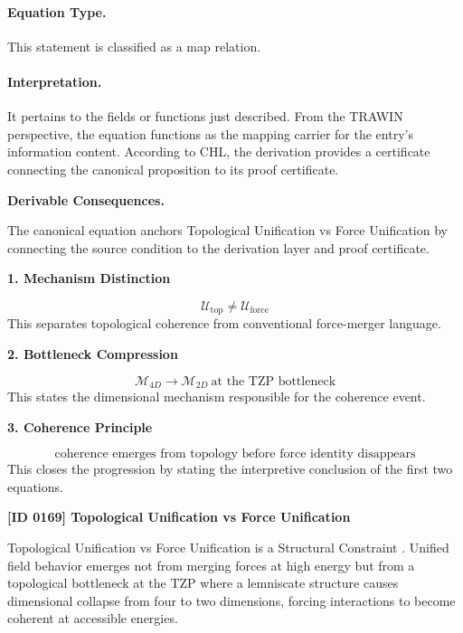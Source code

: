 \paragraph{Equation Type.}
This statement is classified as a map relation.

\paragraph{Interpretation.}
It pertains to the fields or functions just described. From the TRAWIN perspective, the equation functions as the mapping carrier for the entry’s information content. According to CHL, the derivation provides a certificate connecting the canonical proposition to its proof certificate.

\par\vspace{0.35em}
\noindent\textbf{Derivable Consequences.}\quad
\begingroup
\footnotesize
\raggedright
The canonical equation anchors Topological Unification vs Force Unification by connecting the source condition to the derivation layer and proof certificate.
\par\endgroup

\noindent\textbf{1. Mechanism Distinction}\par
\[
\mathcal{U}_{\mathrm{top}}\neq \mathcal{U}_{\mathrm{force}}
\]
\noindent This separates topological coherence from conventional force-merger language.\par
\noindent\textbf{2. Bottleneck Compression}\par
\[
\mathcal{M}_{4D}\longrightarrow \mathcal{M}_{2D}\ \text{at the TZP bottleneck}
\]
\noindent This states the dimensional mechanism responsible for the coherence event.\par
\noindent\textbf{3. Coherence Principle}\par
\[
\text{coherence emerges from topology before force identity disappears}
\]
\noindent This closes the progression by stating the interpretive conclusion of the first two equations.\par

\clearpage
\noindent\textbf{[ID 0169] Topological Unification vs Force Unification}\par
\vspace{0.35em}
\begingroup\small
{}
Topological Unification vs Force Unification is a Structural Constraint  . Unified field behavior emerges not from merging forces at high energy but from a topological bottleneck at the TZP where a lemniscate structure causes dimensional collapse from four to two dimensions, forcing interactions to become coherent at accessible energies.  


